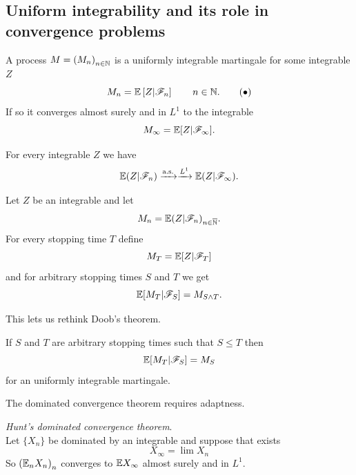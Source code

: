 \documentclass{report}
\begin{document}
\subsection{Uniform integrability and its role in convergence problems}
\begin{theorem}
	A process $M={(M_{n})}_{n\in\mathbb{N}}$ is a uniformly integrable martingale \ifonly{} for some integrable \rv{} $Z$
	\begin{equation}
		M_{n}=\mathbb{E}\left[Z|\mathscr{F}_{n}\right]\qquad n\in\mathbb{N}.\tag{$\bullet$}\label{AAAA}
	\end{equation}
	If so it converges almost surely and in $L^{1}$ to the integrable \rv
	\begin{equation*}
		M_{\infty}=\mathbb{E}[Z|\mathscr{F}_{\infty}].
	\end{equation*}
\end{theorem}
\begin{corollary}
	For every integrable \rv{} $Z$ we have
	\begin{equation*}
		\mathbb{E}(Z|\mathscr{F}_{n})\xrightarrow[]{\text{a.s.}}\xrightarrow[]{L^{1}}\mathbb{E}(Z|\mathscr{F}_{\infty}).
	\end{equation*}
\end{corollary}
\begin{theorem}
	Let $Z$ be an integrable \rv{} and let 
	\begin{equation*}
		M_{n}=\mathbb{E}(Z|\mathscr{F}_{n})_{n\in\overline{\mathbb{N}}}.
	\end{equation*}
	For every stopping time $T$ define
	\begin{equation*}
		M_{T}=\mathbb{E}[Z|\mathscr{F}_{T}]
	\end{equation*}
	and for arbitrary stopping times $S$ and $T$ we get
	\begin{equation*}
		\mathbb{E}[M_{T}|\mathscr{F}_{S}]=M_{S\wedge T}.
	\end{equation*}
\end{theorem}
This lets us rethink Doob's theorem.
\begin{theorem}
	If $S$ and $T$ are arbitrary stopping times such that $S\leq T$ then
	\begin{equation*}
		\mathbb{E}[M_{T}|\mathscr{F}_{S}]=M_{S}
	\end{equation*}
	for an uniformly integrable martingale.
\end{theorem}
The dominated convergence theorem requires adaptness. 
\begin{theorem}
	\emph{Hunt's dominated convergence theorem}.\\
	Let $\{X_{n}\}$ be dominated by an integrable \rv{} and suppose that exists
	\begin{equation*}
		X_{\infty}=\lim X_{n}
	\end{equation*}
	So ${(\mathbb{E}_{n}X_{n})}_{n}$ converges to $\mathbb{E} X_{\infty}$ almost surely and in $L^{1}$.
\end{theorem}
\end{document}
